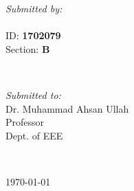 \begin{titlepage}
\begin{minipage}{0.4\textwidth}
\begin{flushleft} \large
\emph{Submitted by:}\\
\@author\\%
ID: \textbf{1702079}\\
Section: \textbf{B}


\end{flushleft}
\end{minipage}
~
\begin{minipage}{0.4\textwidth}
\begin{flushright} \large
\emph{Submitted to:} \\
Dr. Muhammad Ahsan Ullah \\ 
Professor\\
Dept. of EEE
\end{flushright}
\end{minipage}\\[2cm]
\makeatother


{\large \today}\\[2cm] %

\vfill %

\end{titlepage}